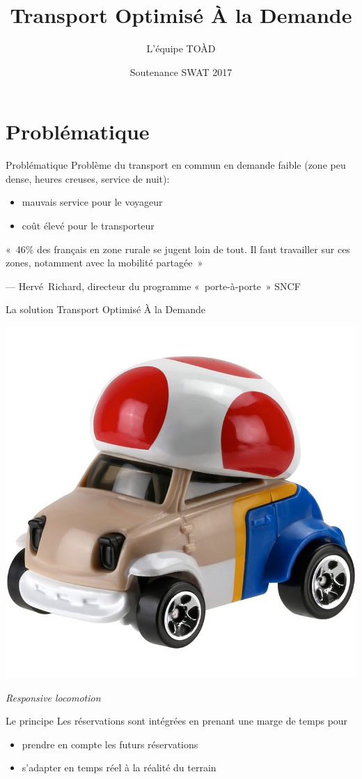 \documentclass[table]{beamer}
\title{Transport Optimisé À la Demande}
\author{L'équipe TOÀD}
\institute[Kisio Digital] %
{
  Kisio Digital\\
  20 rue Hector Malot\\
  75012 Paris, France}
\date{Soutenance SWAT 2017}
\begin{document}
\begin{frame}
  \titlepage
\end{frame}

\section{Problématique}

\begin{frame}{Problématique}
  Problème du transport en commun en demande faible (zone peu dense,
  heures creuses, service de nuit):
  \begin{itemize}
  \item mauvais service pour le voyageur
  \item coût élevé pour le transporteur
  \end{itemize}

  \begin{em}
  «~46\% des français en zone rurale se jugent loin de tout. Il faut
  travailler sur ces zones, notamment avec la mobilité partagée~»    
  \end{em}

  \raggedleft --- Hervé~Richard, directeur du programme
  «~porte-à-porte~» SNCF
\end{frame}

\begin{frame}{La solution}
  Transport Optimisé À la Demande

  \begin{center}
    \includegraphics[width=0.4\linewidth]{images/toad}

    \emph{Responsive locomotion}
  \end{center}
\end{frame}

\begin{frame}{Le principe}
  Les réservations sont intégrées en prenant une marge de temps pour
  \begin{itemize}
  \item prendre en compte les futurs réservations
  \item s'adapter en temps réel à la réalité du terrain
  \end{itemize}
\end{frame}
\end{document}
